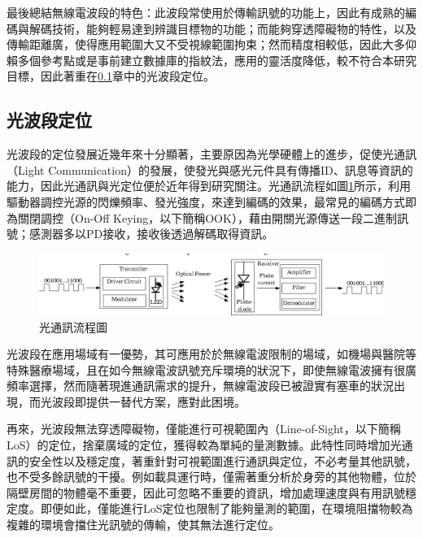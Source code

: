         最後總結無線電波段的特色：此波段常使用於傳輸訊號的功能上，因此有成熟的編碼與解碼技術，能夠輕易達到辨識目標物的功能；而能夠穿透障礙物的特性，以及傳輸距離廣，使得應用範圍大又不受視線範圍拘束；然而精度相較低，因此大多仰賴多個參考點或是事前建立數據庫的指紋法，應用的靈活度降低，較不符合本研究目標，因此著重在\ref{chp:light}章中的光波段定位。

       



       


        \subsection{光波段定位}
        \label{chp:light}
            
            光波段的定位發展近幾年來十分顯著，主要原因為光學硬體上的進步，促使光通訊（Light Communication）的發展，使發光與感光元件具有傳播ID、訊息等資訊的能力，因此光通訊與光定位便於近年得到研究關注\cite{survey_light2018}。光通訊流程如圖\ref{pic:vlc_flow}所示，利用驅動器調控光源的閃爍頻率、發光強度，來達到編碼的效果，最常見的編碼方式即為關閉調控（On-Off Keying，以下簡稱OOK），藉由開關光源傳送一段二進制訊號；感測器多以PD接收，接收後透過解碼取得資訊\cite{pic:vlc}。
            \begin{figure}[ht]
                \centering
                \includegraphics[width=15cm]{ch2pic/vlc_flow.png}
                \caption{光通訊流程圖\cite{pic:vlc}}
                \label{pic:vlc_flow}
            \end{figure}

            光波段在應用場域有一優勢，其可應用於於無線電波限制的場域，如機場與醫院等特殊醫療場域\cite{case:vlc_mobile}，且在如今無線電波訊號充斥環境的狀況下，即使無線電波擁有很廣頻率選擇，然而隨著現進通訊需求的提升，無線電波段已被證實有塞車的狀況出現，而光波段即提供一替代方案，應對此困境。
            
            
            再來，光波段無法穿透障礙物，僅能進行可視範圍內（Line-of-Sight，以下簡稱LoS）的定位，捨棄廣域的定位，獲得較為單純的量測數據。此特性同時增加光通訊的安全性以及穩定度，著重針對可視範圍進行通訊與定位，不必考量其他訊號，也不受多餘訊號的干擾\cite{vlc_adv}。例如載具運行時，僅需著重分析於身旁的其他物體，位於隔壁房間的物體毫不重要，因此可忽略不重要的資訊，增加處理速度與有用訊號穩定度。即便如此，僅能進行LoS定位也限制了能夠量測的範圍，在環境阻擋物較為複雜的環境會擋住光訊號的傳輸，使其無法進行定位。


